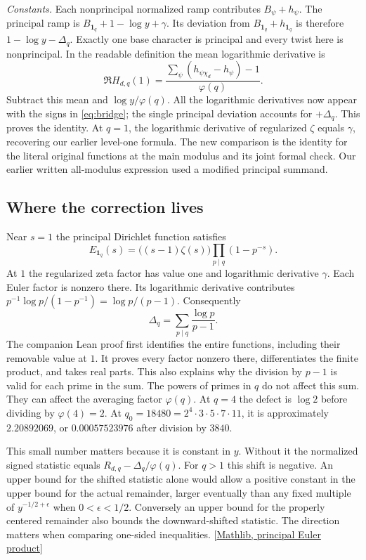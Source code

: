 \documentclass[12pt,letterpaper]{article}
\begin{document}
\emph{Constants.} Each nonprincipal normalized ramp contributes $B_\psi+h_\psi$. The principal ramp is $B_{\mathbf1_q}+1-\log y+\gamma$. Its deviation from $B_{\mathbf1_q}+h_{\mathbf1_q}$ is therefore $1-\log y-\Delta_q$. Exactly one base character is principal and every twist here is nonprincipal. In the readable definition the mean logarithmic derivative is
\[
 \Re H_{d,q}(1)=\frac{\sum_\psi(h_{\psi\chi_d}-h_\psi)-1}{\varphi(q)} .
\]
Subtract this mean and $\log y/\varphi(q)$. All the logarithmic derivatives now appear with the signs in \eqref{eq:bridge}; the single principal deviation accounts for $+\Delta_q$. This proves the identity. At $q=1$, the logarithmic derivative of regularized $\zeta$ equals $\gamma$, recovering our earlier level-one formula. The new comparison is the identity for the literal original functions at the main modulus and its joint formal check. Our earlier written all-modulus expression used a modified principal summand.

\subsection{Where the correction lives}
Near $s=1$ the principal Dirichlet function satisfies
\[
 E_{\mathbf1_q}(s)=\big((s-1)\zeta(s)\big)
          \prod_{p\mid q}(1-p^{-s}).
\]
At $1$ the regularized zeta factor has value one and logarithmic derivative $\gamma$. Each Euler factor is nonzero there. Its logarithmic derivative contributes $p^{-1}\log p/(1-p^{-1})=\log p/(p-1)$. Consequently
\[
 \Delta_q=\sum_{p\mid q}\frac{\log p}{p-1}.
\]
The companion Lean proof first identifies the entire functions, including their removable value at $1$. It proves every factor nonzero there, differentiates the finite product, and takes real parts. This also explains why the division by $p-1$ is valid for each prime in the sum. The powers of primes in $q$ do not affect this sum. They can affect the averaging factor $\varphi(q)$. At $q=4$ the defect is $\log 2$ before dividing by $\varphi(4)=2$. At $q_0=18480=2^4\cdot3\cdot5\cdot7\cdot11$, it is approximately $2.20892069$, or $0.00057523976$ after division by $3840$.

This small number matters because it is constant in $y$. Without it the normalized signed statistic equals $R_{d,q}-\Delta_q/\varphi(q)$. For $q>1$ this shift is negative. An upper bound for the shifted statistic alone would allow a positive constant in the upper bound for the actual remainder, larger eventually than any fixed multiple of $y^{-1/2+\epsilon}$ when $0<\epsilon<1/2$. Conversely an upper bound for the properly centered remainder also bounds the downward-shifted statistic. The direction matters when comparing one-sided inequalities. {\small\sffamily\color{mute}[\href{https://github.com/leanprover-community/mathlib4/blob/56a005855ea17e0b0958f73ec801ae140b0a1679/Mathlib/NumberTheory/LSeries/DirichletContinuation.lean#L173}{Mathlib, principal Euler product}]}
\end{document}
